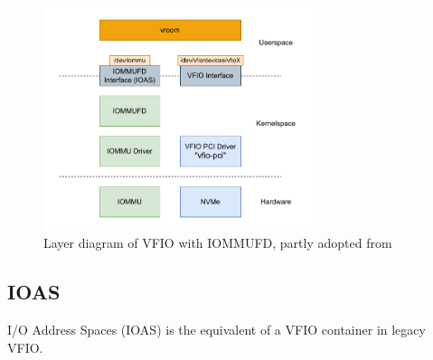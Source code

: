 \begin{figure}
    \centering
    \includegraphics[width=0.7\textwidth]{figures/IOMMUFDLayer.pdf}
    \caption{Layer diagram of VFIO with IOMMUFD, partly adopted from \cite{dpdkiommufd}}
    \label{fig:iommufd-layer}
\end{figure}

\subsection{IOAS}
I/O Address Spaces (IOAS) is the equivalent of a VFIO container in legacy VFIO.
